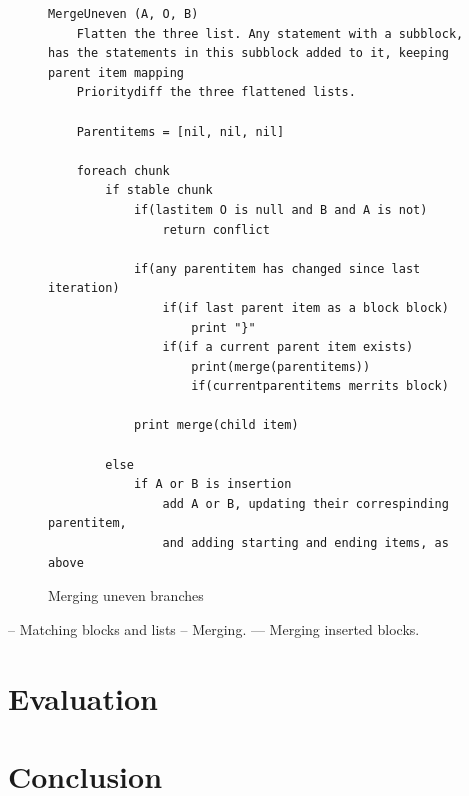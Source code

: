 \documentclass[11pt]{article}
\begin{document}
\begin{figure}
  \caption{Merging uneven branches}
  \label{MergeToken}
\begin{verbatim}
MergeUneven (A, O, B)
    Flatten the three list. Any statement with a subblock, has the statements in this subblock added to it, keeping parent item mapping
    Prioritydiff the three flattened lists.

    Parentitems = [nil, nil, nil]

    foreach chunk
        if stable chunk
            if(lastitem O is null and B and A is not)
                return conflict

            if(any parentitem has changed since last iteration)
                if(if last parent item as a block block)
                    print "}"
                if(if a current parent item exists)
                    print(merge(parentitems))
                    if(currentparentitems merrits block)
            
            print merge(child item)

        else 
            if A or B is insertion
                add A or B, updating their correspinding parentitem,
                and adding starting and ending items, as above
\end{verbatim}
\end{figure}


-- Matching blocks and lists
-- Merging.
--- Merging inserted blocks.

\clearpage
\section{Evaluation}

\clearpage
\section{Conclusion}

\clearpage



\end{document}
